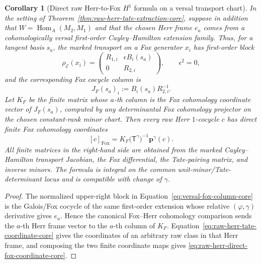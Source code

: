 \documentclass[11pt]{article}
\newtheorem{corollary}[theorem]{Corollary}
\theoremstyle{definition}
\begin{document}
\begin{corollary}[Direct raw Herr-to-Fox $H^1$ formula on a versal transport chart]\label{cor:raw-herr-direct-fox-core}
In the setting of Theorem~\ref{thm:raw-herr-tate-extraction-core}, suppose in addition that $W=\operatorname{Hom}_A(M_2,M_1)$ and that the chosen Herr frame $e_a$ comes from a cohomologically versal first-order Cayley--Hamilton extension family.  Thus, for a tangent basis $s_a$, the marked transport on a Fox generator $x_i$ has first-order block
\[
 \rho_{\mathcal E}(x_i)=
 \begin{pmatrix}
 R_{1,i}&\epsilon B_i(s_a)\\
 0&R_{2,i}
 \end{pmatrix},
 \qquad \epsilon^2=0,
\]
and the corresponding Fox cocycle column is
\begin{equation}\label{eq:versal-fox-column-core}
 J_F(s_a)_i:=B_i(s_a)R_{2,i}^{-1}.
\end{equation}
Let $K_F$ be the finite matrix whose $a$-th column is the Fox cohomology coordinate vector of $J_F(s_a)$, computed by any determinantal Fox cohomology projector on the chosen constant-rank minor chart.  Then every raw Herr $1$-cocycle $c$ has direct finite Fox cohomology coordinates
\begin{equation}\label{eq:raw-herr-direct-fox-coordinate-core}
 \boxed{
 [c]_{\mathrm{Fox}}
 =K_F\bigl(\mathsf T^{\gamma}\bigr)^{-1}
 \mathbf p^{\gamma}(c).}
\end{equation}
All finite matrices in the right-hand side are obtained from the marked Cayley--Hamilton transport Jacobian, the Fox differential, the Tate-pairing matrix, and inverse minors.  The formula is integral on the common unit-minor/Tate-determinant locus and is compatible with change of $\gamma$.
\end{corollary}

\begin{proof}
The normalized upper-right block in Equation~\eqref{eq:versal-fox-column-core} is the Galois/Fox cocycle of the same first-order extension whose relative $(\varphi,\gamma)$ derivative gives $e_a$.  Hence the canonical Fox--Herr cohomology comparison sends the $a$-th Herr frame vector to the $a$-th column of $K_F$.  Equation~\eqref{eq:raw-herr-tate-coordinate-core} gives the coordinates of an arbitrary raw class in that Herr frame, and composing the two finite coordinate maps gives \eqref{eq:raw-herr-direct-fox-coordinate-core}.
\end{proof}
\end{document}
